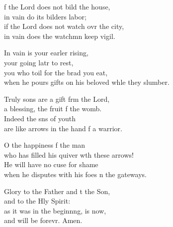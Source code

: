\settowidth{\versewidth}{when he pours gifts on his beloved while they slumber.}
\begin{psalmverse}%
  \begin{patverse}
f the Lord does not bild the house,\Med\\
in vain do its bilders labor;\\
if the Lord does not watch ovr the city,\Med\\
in vain does the watchmn keep vigil.

In vain is your earl\pointup{\i}er rising,\Med\\
your going latr to rest,\\
you who toil for the brad you eat,\Med\\
when he pours gifts on his beloved wh\pointup{\i}le they slumber.

Truly sons are a gift frm the Lord,\Med\\
a blessing, the fruit f the womb.\\
Indeed the sns of youth\Med\\
are like arrows in the hand f a warrior.

O the happiness f the man\Med\\
who has filled his quiver w\pointup{\i}th these arrows!\\
He will have no cuse for shame\Med\\
when he disputes with his foes \pointup{\i}n the gateways.

Glory to the Father and t the Son,\Med\\
and to the Hly Spirit:\\
as it was in the beginn\pointup{\i}ng, is now,\Med\\
and will be forevr. Amen. 
  \end{patverse}
\end{psalmverse}
